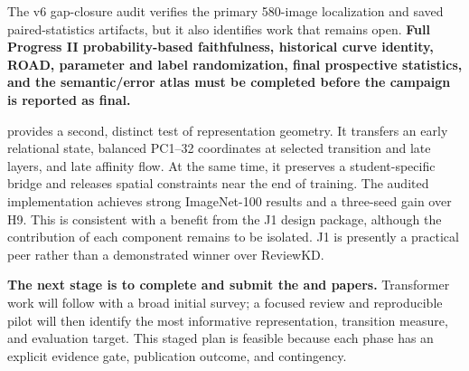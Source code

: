 The v6 gap-closure audit verifies the primary 580-image localization and saved
paired-statistics artifacts, but it also identifies work that remains open.
\textbf{Full Progress II probability-based faithfulness, historical curve
identity, ROAD, parameter and label randomization, final prospective
statistics, and the semantic/error atlas must be completed before the campaign
is reported as final.}

\jmethod{} provides a second, distinct test of representation geometry. It
transfers an early relational state, balanced PC1--32 coordinates at selected
transition and late layers, and late affinity flow. At the same time, it
preserves a student-specific bridge and releases spatial constraints near the
end of training. The audited implementation achieves strong ImageNet-100
results and a three-seed gain over H9. This is consistent with a benefit from
the J1 design package, although the contribution of each component remains to
be isolated. J1 is presently a practical peer rather than a demonstrated
winner over ReviewKD.

\textbf{The next stage is to complete and submit the \methodname{} and
\jmethod{} papers.} Transformer work will follow with a broad initial survey;
a focused review and reproducible pilot will then identify the most informative
representation, transition measure, and evaluation target. This staged plan is
feasible because each phase has an explicit evidence gate, publication outcome,
and contingency.
